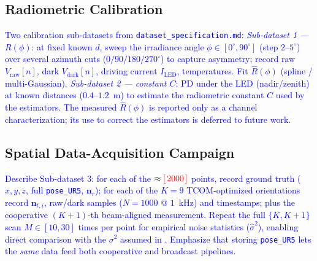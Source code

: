 \documentclass[journal]{IEEEtran}
\newcommand{\ph}[1]{\textcolor{red}{[\,#1\,]}}
\begin{document}
    \subsection{Radiometric Calibration}
    \textcolor{blue}{Two calibration sub-datasets from \texttt{dataset\_specification.md}:
    \emph{Sub-dataset 1 --- $R(\phi)$}: at fixed known $d$, sweep the irradiance angle $\phi\in[0^\circ,90^\circ]$ (step $2$--$5^\circ$) over several azimuth cuts ($0/90/180/270^\circ$) to capture asymmetry; record raw $V_{\mathrm{raw}}[n]$, dark $V_{\mathrm{dark}}[n]$, driving current $I_{\mathrm{LED}}$, temperatures. Fit $\hat R(\phi)$ (spline / multi-Gaussian).
    \emph{Sub-dataset 2 --- constant $C$}: PD under the LED (nadir/zenith) at known distances ($0.4$--$1.2$~m) to estimate the radiometric constant $C$ used by the estimators. The measured $\hat R(\phi)$ is reported only as a channel characterization; its use to correct the estimators is deferred to future work.}

    \subsection{Spatial Data-Acquisition Campaign}
    \textcolor{blue}{Describe Sub-dataset 3: for each of the $\approx\ph{2000}$ points, record ground truth ($x,y,z$, full \texttt{pose\_UR5}, $\mathbf{n}_r$); for each of the $K{=}9$ TCOM-optimized orientations record $\mathbf{n}_{t,i}$, raw/dark samples ($N{=}1000$ @ $1$~kHz) and timestamps; plus the cooperative $(K{+}1)$-th beam-aligned measurement. Repeat the full $\{K,K{+}1\}$ scan $M\in[10,30]$ times per point for empirical noise statistics ($\hat\sigma^2$), enabling direct comparison with the $\sigma^2$ assumed in \cite{acuna2025model, acuna2026broadcast}. Emphasize that storing \texttt{pose\_UR5} lets the \emph{same} data feed both cooperative and broadcast pipelines.}
\end{document}
